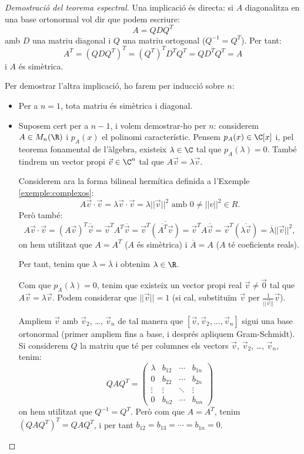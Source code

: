 \begin{proof}[Demostració del teorema espectral]
Una implicació és directa: si $A$ diagonalitza en una base ortonormal vol dir que podem escriure:
\[
A=Q D Q^T
\]
amb $D$ una matriu diagonal i $Q$ una matriu ortogonal ($Q^{-1}=Q^T$). Per tant:
\[
A^T=(QDQ^T)^T=(Q^T)^T D^T Q^T=Q D^T Q^T=A
\]
i $A$ és simètrica.

Per demostrar l'altra implicació, ho farem per inducció sobre $n$:
\begin{itemize}
    \item Per a $n=1$, tota matriu és simètrica i diagonal.
    \item Suposem cert per a $n-1$, i volem demostrar-ho per $n$: considerem $A\in M_n(\R)$ i $p_A(x)$ el polinomi característic. Pensem $p_A(x)\in\C[x]$ i, pel teorema fonamental de l'àlgebra, existeix $\lambda \in \C$ tal que $p_A(\lambda)=0$. També tindrem un vector propi $\vec v\in \C^n$ tal que $A \vec v=\lambda \vec v$.
    
    Considerem ara la forma bilineal hermítica definida a l'Exemple \ref{exemple:complexos}:
    \[
    A\vec v \cdot \vec v = \lambda \vec v \cdot \vec v= \lambda ||\vec v||^2 \text{ amb $0\neq ||v||^2\in R$}.
    \]
    Però també:
    \[
    A\vec v \cdot\vec  v = (A \vec v)^T \overline{\vec v} = \vec v^T A^T \overline{\vec v} = \vec v^T \overline{(\overline{A^T} \vec v)} = \vec v^T A \overline{\vec v} = \vec v^T (\overline{\lambda \vec v})=\overline{\lambda} ||\vec v||^2 , 
    \]
    on hem utilitzat que $A=A^T$ ($A$ és simètrica) i $\overline A=A$ ($A$ té coeficients reals).
    
    Per tant, tenim que $\lambda=\overline{\lambda}$ i obtenim $\lambda \in \R$.
    
    Com que $p_A(\lambda)=0$, tenim que existeix un vector propi real $\vec v\neq \vec 0$ tal que $A\vec v=\lambda \vec v$. Podem considerar que $||\vec v||=1$ (si cal, substituïm $\vec v$ per $\frac{1}{||\vec v||}\vec v$).
    
    Ampliem $\vec v$ amb $\vec v_2$, \dots, $\vec v_n$ de tal manera que $[\vec v,\vec v_2, \dots ,\vec v_n]$ sigui una base ortonormal (primer ampliem fins a base, i després apliquem Gram-Schmidt). Si considerem $Q$ la matriu que té per columnes els vectors $\vec v$, $\vec v_2$, \ldots , $\vec v_n$, tenim:
    \[
    QAQ^T=\begin{pmatrix} \lambda & b_{12} & \cdots & b_{1n} \\
    0 & b_{22} & \cdots & b_{2n} \\
    \vdots & \vdots & \ddots & \vdots \\
    0 & b_{n2} & \cdots  & b_{nn}
    \end{pmatrix}
    \]
    on hem utilitzat que $Q^{-1}=Q^T$. Però com que $A=A^T$, tenim $(QAQ^T)^T=QAQ^T$, i per tant $b_{12}=b_{13}=\cdots=b_{1n}=0$.
    

\end{itemize}
\end{proof}
